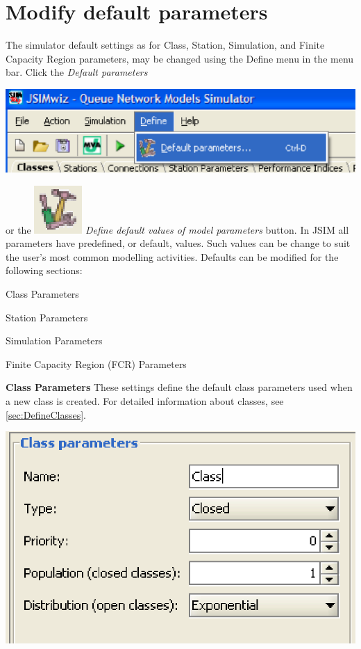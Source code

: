 \section{Modify default parameters}
\label{sec:ModifyDefaultParameters} The simulator default settings
as for Class, Station, Simulation, and Finite Capacity Region
parameters, may be changed using the Define menu in the menu bar.
Click the \emph{Default parameters}
\begin{center}
\includegraphics[scale=.5]{img/jsim/define1.eps}
\end{center}
or the \includegraphics[scale=.5]{img/jsim/define2.eps}
\emph{Define default values of model parameters} button. In JSIM
all parameters have predefined, or default, values. Such values
can be change to suit the user's most common modelling activities.
Defaults can be modified for the following sections:
\begin{itemize*}
\item Class Parameters
\item Station Parameters
\item Simulation Parameters
\item Finite Capacity Region (FCR) Parameters
\end{itemize*}
\textbf{Class Parameters}
These settings define the default class parameters used when a new class is created. For detailed information about classes, see \autoref{sec:DefineClasses}.
\begin{center}
\includegraphics[scale=.5]{img/jsim/Class_Parameters.eps}
\end{center}
